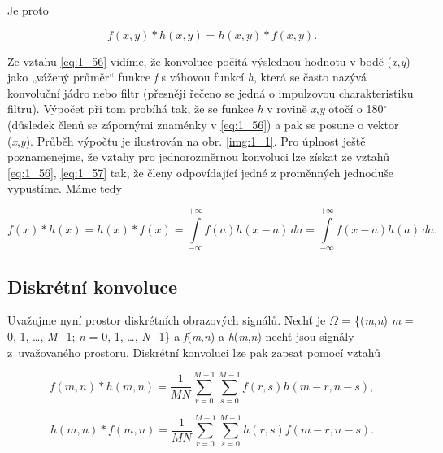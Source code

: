 Je proto

\begin{equation} \label{eq:1_58}
    f(x, y) \ast h(x, y) = h(x, y) \ast f(x, y).
\end{equation}

Ze vztahu \eqref{eq:1_56} vidíme, že konvoluce počítá výslednou hodnotu v bodě (\textit{x},\textit{y}) jako „vážený průměr`` funkce \textit{f} s váhovou funkcí \textit{h}, která se často nazývá konvoluční jádro nebo filtr (přesněji řečeno se jedná o impulzovou charakteristiku filtru). Výpočet při tom probíhá tak, že se funkce \textit{h} v rovině \textit{x},\textit{y} otočí o 180$^\circ$ (důsledek členů se zápornými znaménky v \eqref{eq:1_56}) a pak se posune o vektor (\textit{x},\textit{y}). Průběh výpočtu je ilustrován na obr. \ref{img:1_1}. Pro úplnost ještě poznamenejme, že vztahy pro jednorozměrnou konvoluci lze získat ze vztahů \eqref{eq:1_56}, \eqref{eq:1_57} tak, že členy odpovídající jedné z proměnných jednoduše vypustíme. Máme tedy

\begin{equation} \label{eq:1_59}
    f(x) \ast h(x) = h(x) \ast f(x) = \int\limits_{-\infty}^{+\infty} f(a)h(x-a)\,da = \int\limits_{-\infty}^{+\infty} f(x-a) h(a)\,da.
\end{equation}

\subsection*{Diskrétní konvoluce} \label{sec:diskretni_konvoluce}

Uvažujme nyní prostor diskrétních obrazových signálů. Nechť je $\Omega$ = \{(\textit{m},\textit{n}) \textbar  \textit{m} = 0, 1, \dots, \textit{M}$-$1; \textit{n} = 0, 1, \dots, \textit{N}$-$1\} a \textit{f}(\textit{m},\textit{n}) a \textit{h}(\textit{m},\textit{n}) nechť jsou signály z~uvažovaného prostoru. Diskrétní konvoluci lze pak zapsat pomocí vztahů

\begin{equation} \label{eq:1_60}
    f(m, n) \ast h(m, n) = \frac{1}{MN} \sum\limits_{r=0}^{M-1} \sum\limits_{s=0}^{M-1} f(r, s) h(m - r, n - s),
\end{equation}

\begin{equation} \label{eq:1_61}
    h(m, n) \ast f(m, n) = \frac{1}{MN} \sum\limits_{r=0}^{M-1} \sum\limits_{s=0}^{M-1} h(r, s) f(m - r, n - s).
\end{equation}

